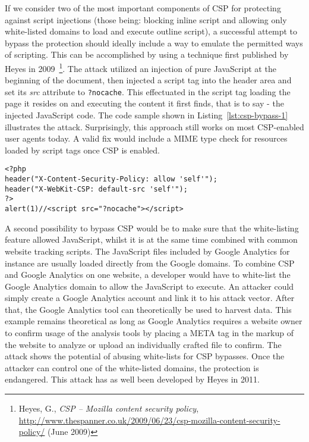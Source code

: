     If we consider two of the most important components of CSP for protecting against script injections (those being: blocking inline script and allowing only white-listed domains to load and execute outline script), a successful attempt to bypass the protection should ideally include a way to emulate the permitted ways of scripting. This can be accomplished by using a technique first published by Heyes in 2009~\footnote{Heyes, G., \textit{CSP -- Mozilla content security policy}, \url{http://www.thespanner.co.uk/2009/06/23/csp-mozilla-content-security-policy/} (June 2009)}. The attack utilized an injection of pure JavaScript at the beginning of the document, then injected a script tag into the header area and set its \textit{src} attribute to \texttt{?nocache}. This effectuated in the script tag loading the page it resides on and executing the content it first finds, that is to say - the injected JavaScript code. The code sample shown in Listing~\ref{lst:csp-bypass-1} illustrates the attack. Surprisingly, 
this approach still works on most CSP-enabled user agents today. A valid fix would include a MIME type check for resources loaded by script tags once CSP is enabled.

\begin{lstlisting}[captionpos=b,label=lst:csp-bypass-1,caption=Bypassing CSP via self-including JavaScript; the src=?nocache has the file include itself and execute the payload alert(1),captionpos=b]
<?php 
header("X-Content-Security-Policy: allow 'self'");
header("X-WebKit-CSP: default-src 'self'"); 
?>
alert(1)//<script src="?nocache"></script>
\end{lstlisting}

    A second possibility to bypass CSP would be to make sure that the white-listing feature allowed JavaScript, whilst it is at the same time combined with common website tracking scripts. The JavaScript files included by Google Analytics for instance are usually loaded directly from the Google domains. 
    To combine CSP and Google Analytics on one website, a developer would have to white-list the Google Analytics domain to allow the JavaScript to execute. An attacker could simply create a Google Analytics account and link it to his attack vector. After that, the Google Analytics tool can theoretically be used to harvest data. This example remains theoretical as long as Google Analytics requires a website owner to confirm usage of the analysis tools by placing a META tag in the markup of the website to analyze or upload an individually crafted file to confirm. The attack shows the potential of abusing white-lists for CSP bypasses. Once the attacker can control one of the white-listed domains, the protection is endangered. This attack has as well been developed by Heyes in 2011.\\

